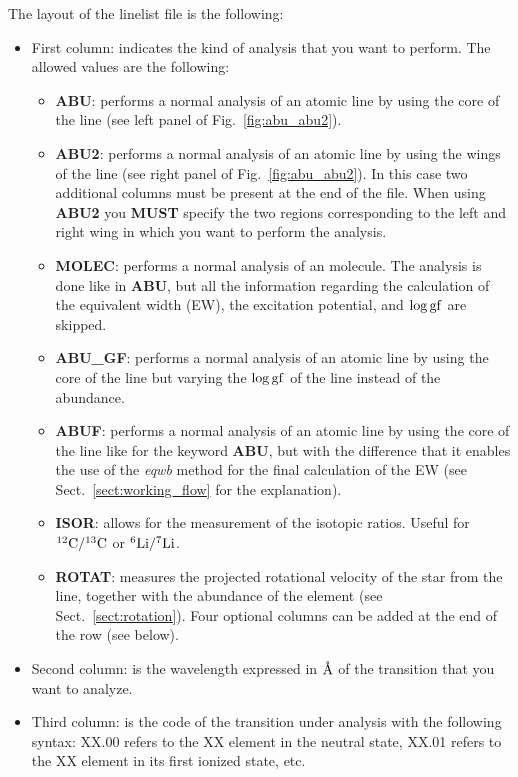 \documentclass[modern]{aastex701}
\newcommand{\angstrom}{\mbox{\normalfont\AA}}
\begin{document}
The layout of the linelist file is the following:
\begin{itemize}
    \item First column: indicates the kind of analysis that you want to perform. The allowed values are the following:
        \begin{itemize}
            \item {\bf ABU}: performs a normal analysis of an atomic line by using the core of the line (see left panel of Fig.~\ref{fig:abu_abu2}).
            \item {\bf ABU2}: performs a normal analysis of an atomic line by using the wings of the line (see right panel of Fig.~\ref{fig:abu_abu2}). In this case two additional columns must  be present at the end of the file. When using {\bf ABU2} you {\bf MUST} specify the two regions corresponding to the left and right wing in which you want to perform the analysis. 
            \item {\bf MOLEC}: performs a normal analysis of an molecule. The analysis is done like in {\bf ABU}, but all the information regarding the calculation of the equivalent width (EW), the excitation potential, and $\rm \log gf$ are skipped.
            \item {\bf ABU\_GF}: performs a normal analysis of an atomic line by using the core of the line but varying the $\rm \log gf$ of the line instead of the abundance.  
            \item {\bf ABUF}: performs a normal analysis of an atomic line by using the core of the line like for the keyword {\bf ABU}, but with the difference that it enables the use of the {\it eqwb} method for the final calculation of the EW (see Sect.~\ref{sect:working_flow} for the explanation). 
            \item {\bf ISOR}: allows for the measurement of the isotopic ratios. Useful for $\rm ^{12}C/^{13}C$ or $\rm ^{6}Li/^7Li$.
            \item {\bf ROTAT}: measures the projected rotational velocity of the star from the line, together with the abundance of the element (see Sect.~\ref{sect:rotation}). Four optional columns can be added at the end of the row (see below).
        \end{itemize}
    \item Second column: is the wavelength expressed in $\angstrom$ of the transition that you want to analyze.
    \item Third column: is the code of the transition under analysis with the following syntax: XX.00 refers to the XX element in the neutral state, XX.01 refers to the XX element in its first ionized state, etc.

\end{itemize}
\end{document}

